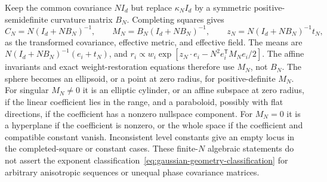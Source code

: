 Keep the common covariance $NI_d$ but replace $\kappa_NI_d$ by a
symmetric positive-semidefinite curvature matrix $B_N$. Completing
squares gives
\begin{equation}
 C_N=N(I_d+NB_N)^{-1},\qquad
 M_N=B_N(I_d+NB_N)^{-1},\qquad
 z_N=N(I_d+NB_N)^{-1}t_N,
 \label{eq:anisotropic-effective-metric}
\end{equation}
as the transformed covariance, effective metric, and effective field.
The means are $N(I_d+NB_N)^{-1}(e_i+t_N)$, and
$r_i\propto w_i\exp[z_N\cdot e_i-N^2e_i^{\mathsf T}M_Ne_i/2]$.
The affine invariants and exact weight-restoration equations
therefore use $M_N$, not $B_N$. The sphere becomes an ellipsoid, or a
point at zero radius, for positive-definite $M_N$. For singular
$M_N\ne0$ it is an elliptic cylinder, or an affine subspace at zero
radius, if the linear coefficient lies in the range, and a
paraboloid, possibly with flat directions, if the coefficient has a
nonzero nullspace component. For $M_N=0$ it is a hyperplane if the
coefficient is nonzero, or the whole space if the coefficient and
compatible constant vanish. Inconsistent level constants give an
empty locus in the completed-square or constant cases. These
finite-$N$ algebraic statements do not assert the exponent
classification~\eqref{eq:gaussian-geometry-classification} for
arbitrary anisotropic sequences or unequal phase covariance matrices.
